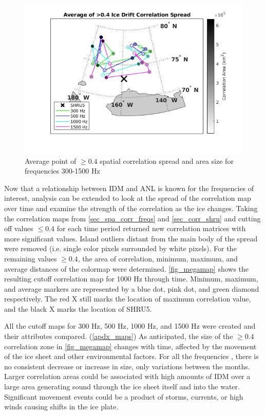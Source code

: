 \begin{figure}[p]
\centering
\includegraphics[scale=0.5]{Figures/avg_corr_summary.jpg}
\caption{Average point of $\geq 0.4$ spatial correlation spread and area size for frequencies 300-1500 Hz}
\label{fig_avgmap}
\end{figure}

Now that a relationship between IDM and ANL is known for the frequencies of interest, analysis can be extended to look at the spread of the correlation map over time and examine the strength of the correlation as the ice changes. Taking the correlation maps from \autoref{sec_spa_corr_freqs} and \autoref{sec_corr_shru} and cutting off values $\leq 0.4$ for each time period returned new correlation matrices with more significant values. Island outliers distant from the main body of the spread were removed (i.e. single color pixels surrounded by white pixels). For the remaining values $\geq 0.4$, the area of correlation, minimum, maximum, and average distances of the colormap were determined. \autoref{fig_megamap} shows the resulting cutoff correlation map for 1000 Hz through time. Minimum, maximum, and average markers are represented by a blue dot, pink dot, and green diamond respectively. The red X still marks the location of maximum correlation value, and the black X marks the location of SHRU5.

All the cutoff maps for 300 Hz, 500 Hz, 1000 Hz, and 1500 Hz were created and their attributes compared. (\autoref{apdx_maps}) As anticipated, the size of the $\geq 0.4$ correlation zone in \autoref{fig_megamap} changes with time, affected by the movement of the ice sheet and other environmental factors. For all the frequencies , there is no consistent decrease or increase in size, only variations between the months. Larger correlation areas could be associated with high amounts of IDM over a large area generating sound through the ice sheet itself and into the water. Significant movement events could be a product of storms, currents, or high winds causing shifts in the ice plate. %

